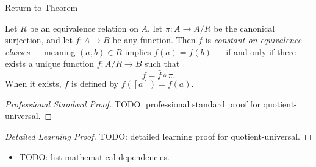 \newpage
{}
\label{prf:quotient-universal}

\begin{remark*}[Return]
\hyperref[thm:quotient-universal]{Return to Theorem}
\end{remark*}

\begin{theorem*}
Let $R$ be an equivalence relation on $A$, let $\pi : A \to A/R$ be the
canonical surjection, and let $f : A \to B$ be any function. Then $f$ is
\emph{constant on equivalence classes} --- meaning $(a,b) \in R$ implies
$f(a) = f(b)$ --- if and only if there exists a unique function
$\bar{f} : A/R \to B$ such that
\[
f = \bar{f} \circ \pi.
\]
When it exists, $\bar{f}$ is defined by $\bar{f}([a]) = f(a)$.
\end{theorem*}

\begin{proof}[Professional Standard Proof]
\LRAProofBodyStart
TODO: professional standard proof for quotient-universal.
\end{proof}

\begin{proof}[Detailed Learning Proof]
\LRAProofBodyStart
TODO: detailed learning proof for quotient-universal.
\end{proof}

\begin{remark*}
\end{remark*}

\begin{dependencies}
\begin{itemize}
  \item TODO: list mathematical dependencies.
\end{itemize}
\end{dependencies}

\clearpage
